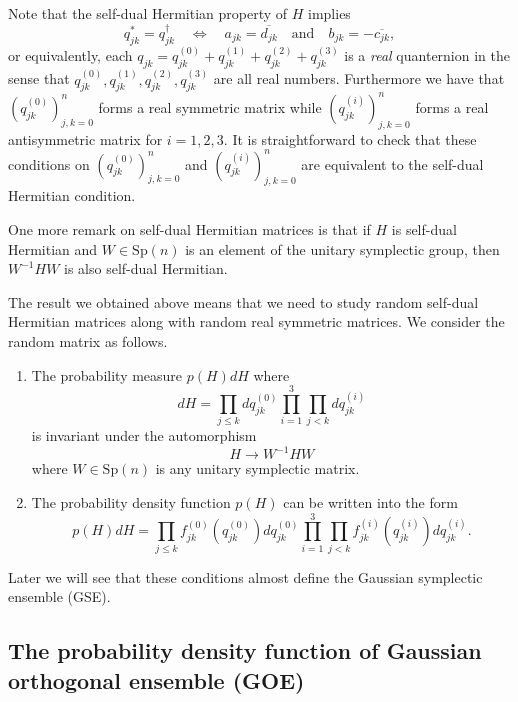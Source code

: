 \documentclass[11pt, a4paper]{article}
\numberwithin{equation}{section}
\newcommand{\Symplectic}{\mathrm{Sp}}
\theoremstyle{definition}
\theoremstyle{remark}
\begin{document}
Note that the self-dual Hermitian property of $H$ implies
\begin{equation}
  q^*_{jk} = q^{\dagger}_{jk} \quad \Leftrightarrow \quad a_{jk} = \overline{d_{jk}} \quad \text{and} \quad b_{jk} = -\overline{c_{jk}},
\end{equation}
or equivalently, each $q_{jk} = q^{(0)}_{jk} + q^{(1)}_{jk} + q^{(2)}_{jk} + q^{(3)}_{jk}$ is a \emph{real} quanternion in the sense that $q^{(0)}_{jk}, q^{(1)}_{jk}, q^{(2)}_{jk}, q^{(3)}_{jk}$ are all real numbers. Furthermore we have that $(q^{(0)}_{jk})^n_{j, k = 0}$ forms a real symmetric matrix while $(q^{(i)}_{jk})^n_{j, k = 0}$ forms a real antisymmetric matrix for $i = 1, 2, 3$. It is straightforward to check that these conditions on $(q^{(0)}_{jk})^n_{j, k = 0}$ and $(q^{(i)}_{jk})^n_{j, k = 0}$ are equivalent to the self-dual Hermitian condition.

One more remark on self-dual Hermitian matrices is that if $H$ is self-dual Hermitian and $W \in \Symplectic(n)$ is an element of the unitary symplectic group, then $W^{-1} H W$ is also self-dual Hermitian.

The result we obtained above means that we need to study random self-dual Hermitian matrices along with random real symmetric matrices. We consider the random matrix as follows.
\begin{enumerate}
\item \label{enu:condition_for_GSE:1}
  The probability measure $p(H) dH$ where
  \begin{equation}
    dH = \prod_{j \leq k} d q^{(0)}_{jk} \prod^3_{i = 1} \prod_{j < k} d q^{(i)}_{jk}
  \end{equation}
  is invariant under the automorphism
  \begin{equation}
    H \to W^{-1} H W
  \end{equation}
  where $W \in \Symplectic(n)$ is any unitary symplectic matrix.
\item
  The probability density function $p(H)$ can be written into the form
  \begin{equation}
    p(H) dH = \prod_{j \leq k} f^{(0)}_{jk}(q^{(0)}_{jk}) d q^{(0)}_{jk} \prod^3_{ i = 1} \prod_{j < k} f^{(i)}_{jk}(q^{(i)}_{jk}) d q^{(i)}_{jk}.
  \end{equation}
\end{enumerate}
Later we will see that these conditions almost define the Gaussian symplectic ensemble (GSE).

\subsection{The probability density function of Gaussian orthogonal ensemble (GOE)}
\end{document}
